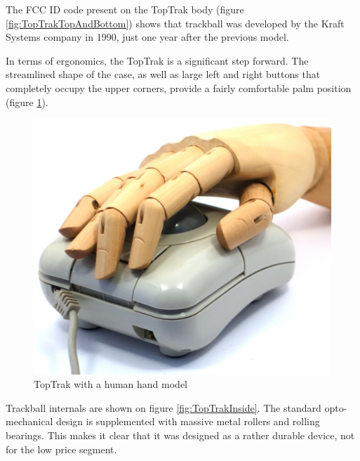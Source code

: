 \documentclass[11pt, a4paper]{article}
\begin{document}
The FCC ID code present on the TopTrak body (figure \ref{fig:TopTrakTopAndBottom}) shows that trackball was developed by the Kraft Systems company in 1990, just one year after the previous model.

In terms of ergonomics, the TopTrak is a significant step forward. The streamlined shape of the case, as well as large left and right buttons that completely occupy the upper corners, provide a fairly comfortable palm position (figure \ref{fig:TopTrakHand}).


\begin{figure}[h]
    \centering
    \includegraphics[scale=0.45]{1990_kraft_toptrack/hand_60.jpg}
    \caption{TopTrak with a human hand model}
    \label{fig:TopTrakHand}
\end{figure}



Trackball internals are shown on figure \ref{fig:TopTrakInside}. The standard opto-mechanical design is supplemented with massive metal rollers and rolling bearings. This makes it clear that it was designed as a rather durable device, not for the low price segment.
\end{document}
